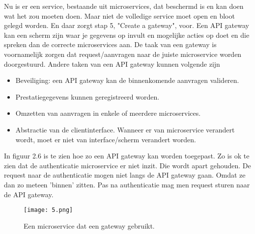 Nu is er een service, bestaande uit microservices, dat beschermd is en kan doen wat het zou moeten doen. Maar niet de  volledige service moet open en bloot gelegd worden. En daar zorgt stap 5, "Create a gateway", voor. Een API gateway kan een scherm zijn waar je gegevens op invult en mogelijke acties op doet en die spreken dan de correcte microservices aan. De taak van een gateway is voornamelijk zorgen dat request/aanvragen naar de juiste microservice worden doorgestuurd. Andere taken van een API gateway kunnen volgende zijn
\begin{itemize}
	\item Beveiliging: een API gateway kan de binnenkomende aanvragen valideren. 
	\item Prestatiegegevens kunnen geregistreerd worden.
	\item Omzetten van aanvragen in enkele of meerdere microservices.
	\item Abstractie van de clientinterface. Wanneer er van microservice verandert wordt, moet er niet van interface/scherm verandert worden. 
\end{itemize}

In figuur 2.6 is te zien hoe zo een API gateway kan worden toegepast. Zo is ok te zien dat de authenticatie microservice er niet inzit. Die wordt apart gehouden. De request naar de authenticatie mogen niet langs de API gateway gaan. Omdat ze dan zo meteen 'binnen' zitten. Pas na authenticatie mag men request sturen naar de API gateway.
\begin{figure}[h]
	\texttt{[image: 5.png]}
	\caption{Een microservice dat een gateway gebruikt. \textcite{Benetis2016}}
	\centering
\end{figure}

